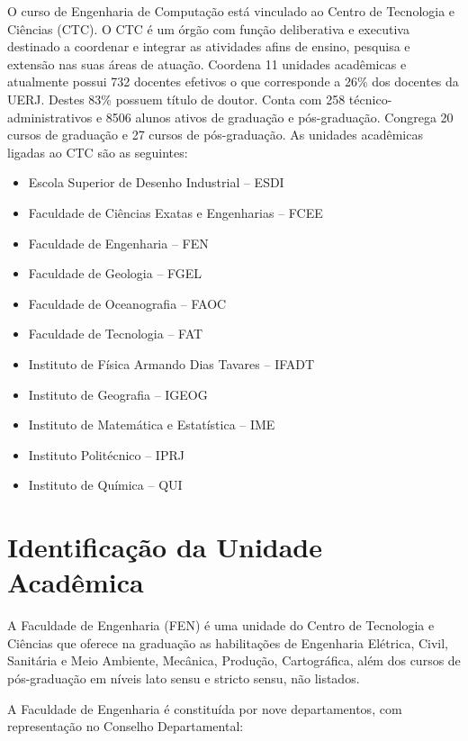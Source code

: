 O curso de Engenharia de Computação está vinculado ao Centro de Tecnologia e Ciências (CTC).
O CTC é um órgão com função deliberativa e executiva destinado a coordenar e integrar as atividades afins de ensino, pesquisa e extensão nas suas áreas de atuação. Coordena 11 unidades acadêmicas e atualmente possui 732 docentes efetivos o que corresponde a 26\% dos docentes da UERJ. Destes 83\% possuem título de doutor. Conta com 258 técnico-administrativos e 8506 alunos ativos de graduação e pós-graduação. Congrega 20 cursos de graduação e 27 cursos de pós-graduação. As unidades acadêmicas ligadas ao CTC são as seguintes:

\begin{itemize}

\item Escola Superior de Desenho Industrial – ESDI
\item Faculdade de Ciências Exatas e Engenharias – FCEE
\item Faculdade de Engenharia – FEN
\item Faculdade de Geologia – FGEL
\item Faculdade de Oceanografia – FAOC
\item Faculdade de Tecnologia – FAT
\item Instituto de Física Armando Dias Tavares – IFADT
\item Instituto de Geografia – IGEOG
\item Instituto de Matemática e Estatística – IME
\item Instituto Politécnico – IPRJ
\item Instituto de Química – QUI

\end{itemize}

\section{Identificação da Unidade Acadêmica}

A Faculdade de Engenharia (FEN) é uma unidade do Centro de Tecnologia e Ciências que oferece na graduação as habilitações de Engenharia Elétrica, Civil, Sanitária e Meio Ambiente, Mecânica, Produção, Cartográfica, além dos cursos de pós-graduação em níveis lato sensu e stricto sensu, não listados.

A Faculdade de Engenharia é constituída por nove departamentos, com representação no Conselho Departamental: 

